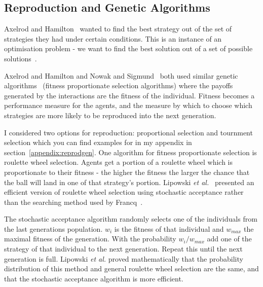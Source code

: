 \documentclass[]{final_report}
\begin{document}
\subsection{Reproduction and Genetic Algorithms}
\label{subs:backgroundreproduction}
Axelrod and Hamilton~\cite{evolution_of_cooperation} wanted to find the best strategy out of the set of strategies they had under certain conditions. This is an instance of an optimisation problem - we want to find the best solution out of a set of possible solutions~\cite{optimisation_problems}.\par 
Axelrod and Hamilton and Nowak and Sigmund~\cite{evol_indirect_image} both used similar genetic algorithms~\cite{mitchell1998introduction} (fitness proportionate selection algorithms) where the payoffs generated by the interactions are the fitness of the individual. Fitness becomes a performance measure for the agents, and the measure by which to choose which strategies are more likely to be reproduced into the next generation.\par 
I considered two options for reproduction: proportional selection and tournment selection which you can find examples for in my appendix in section~\ref{appendix:reprodgen}. One algorithm for fitness proportionate selection is roulette wheel selection. Agents get a portion of a roulette wheel which is proportionate to their fitness - the higher the fitness the larger the chance that the ball will land in one of that strategy's portion. Lipowski \textit{et al.}~\cite{lipowski2012roulette} presented an efficient version of roulette wheel selection using stochastic acceptance rather than the searching method used by Francq~\cite{genetic_algorithms}.\par 
The stochastic acceptance algorithm randomly selects one of the individuals from the last generations population. $w_i$ is the fitness of that individual and $w_{max}$ the maximal fitness of the generation. With the probability $w_i / w_{max}$ add one of the strategy of that individual to the next generation. Repeat this until the next generation is full. Lipowski \textit{et al.} proved mathematically that the probability distribution of this method and general roulette wheel selection are the same, and that the stochastic acceptance algorithm is more efficient.
\end{document}
